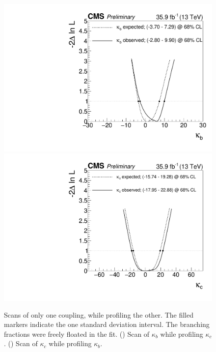 \begin{figure}[Hbtp]
  \begin{center}
    \includegraphics[width=\cmsFigWidth]{img/resultsapproval/reworked/onekappascan_kbkc_floatingBRs_kappab.pdf}
    \includegraphics[width=\cmsFigWidth]{img/resultsapproval/reworked/onekappascan_kbkc_floatingBRs_kappac.pdf}
    \caption{
        Scans of only one coupling, while profiling the other.
        The filled markers indicate the one standard deviation interval.
        The branching fractions were freely floated in the fit.
        (\cmsLeft)
            Scan of $\kappa_b$ while profiling $\kappa_c$.
        (\cmsRight)
            Scan of $\kappa_c$ while profiling $\kappa_b$.
        }
    \label{fig:scans_kappabkappac_oneDimScans_scenario2}
  \end{center}
\end{figure}

